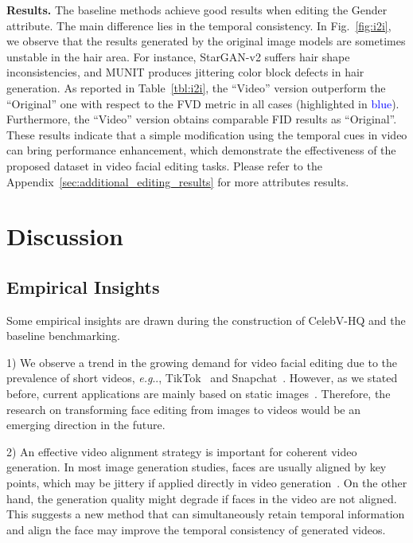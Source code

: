 \documentclass[runningheads]{llncs}
\makeatletter
\DeclareRobustCommand\onedot{\futurelet\@let@token\@onedot}
\def\@onedot{\ifx\@let@token.\else.\null\fi\xspace}
\def\eg{\emph{e.g}\onedot} \def\Eg{\emph{E.g}\onedot}
\makeatother
\begin{document}
\noindent
\textbf{Results.}
The baseline methods achieve good results when editing the Gender attribute. The main difference lies in the temporal consistency. 
In Fig.~\ref{fig:i2i}, we observe that the results generated by the original image models are sometimes unstable in the hair area. For instance, StarGAN-v2 suffers hair shape inconsistencies, and MUNIT produces jittering color block defects in hair generation. 
As reported in Table~\ref{tbl:i2i}, the ``Video'' version outperform the ``Original'' one with respect to the FVD metric in all cases (highlighted in \textcolor{blue}{blue}).
Furthermore, the ``Video'' version obtains comparable FID results as ``Original''. 
These results indicate that a simple modification using the temporal cues in video can bring performance enhancement, which demonstrate the effectiveness of the proposed dataset in video facial editing tasks. Please refer to the Appendix~\ref{sec:additional_editing_results} for more attributes results.


\section{Discussion}



\subsection{Empirical Insights}
Some empirical insights are drawn during the construction of CelebV-HQ and the baseline benchmarking. 

1) We observe a trend in the growing demand for video facial editing due to the prevalence of short videos, \eg, TikTok~\cite{tiktok} and Snapchat~\cite{snapchat}. However, as we stated before, current applications are mainly based on static images~\cite{faceapp,snapchat}. 
Therefore, the research on transforming face editing from images to videos would be an emerging direction in the future. 

2) An effective video alignment strategy is important for coherent video generation.
In most image generation studies, faces are usually aligned by key points, which may be jittery if applied directly in video generation~\cite{bilayermodel}. On the other hand, the generation quality might degrade if faces in the video are not aligned. 
This suggests a new method that can simultaneously retain temporal information and align the face may improve the temporal consistency of generated videos.
\end{document}
